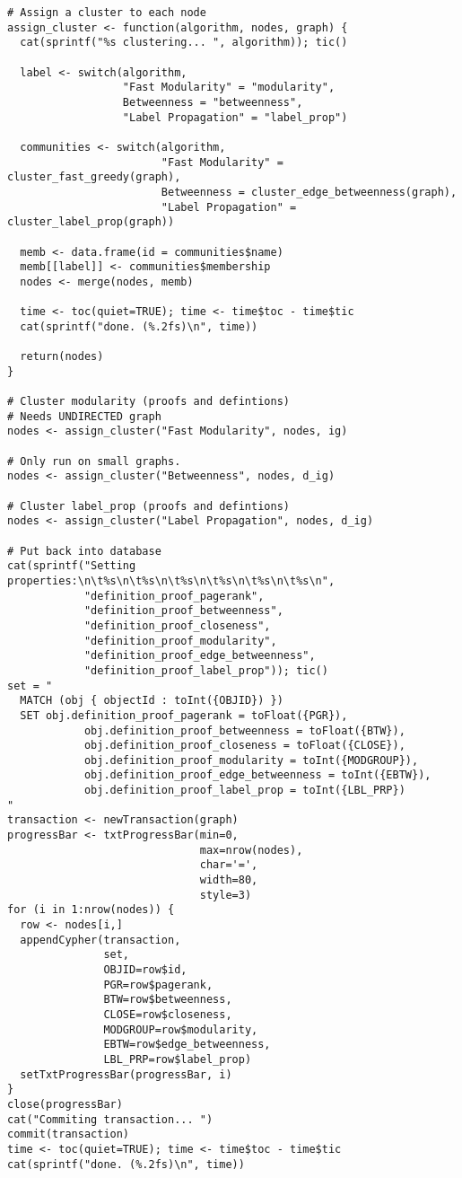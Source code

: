 \begin{verbatim}
# Assign a cluster to each node
assign_cluster <- function(algorithm, nodes, graph) {
  cat(sprintf("%s clustering... ", algorithm)); tic()

  label <- switch(algorithm,
                  "Fast Modularity" = "modularity",
                  Betweenness = "betweenness",
                  "Label Propagation" = "label_prop")

  communities <- switch(algorithm,
                        "Fast Modularity" = cluster_fast_greedy(graph),
                        Betweenness = cluster_edge_betweenness(graph),
                        "Label Propagation" = cluster_label_prop(graph))

  memb <- data.frame(id = communities$name)
  memb[[label]] <- communities$membership
  nodes <- merge(nodes, memb)

  time <- toc(quiet=TRUE); time <- time$toc - time$tic
  cat(sprintf("done. (%.2fs)\n", time))

  return(nodes)
}

# Cluster modularity (proofs and defintions) 
# Needs UNDIRECTED graph
nodes <- assign_cluster("Fast Modularity", nodes, ig)

# Only run on small graphs.
nodes <- assign_cluster("Betweenness", nodes, d_ig)

# Cluster label_prop (proofs and defintions)
nodes <- assign_cluster("Label Propagation", nodes, d_ig)

# Put back into database
cat(sprintf("Setting properties:\n\t%s\n\t%s\n\t%s\n\t%s\n\t%s\n\t%s\n",
            "definition_proof_pagerank",
            "definition_proof_betweenness",
            "definition_proof_closeness",
            "definition_proof_modularity",
            "definition_proof_edge_betweenness",
            "definition_proof_label_prop")); tic()
set = "
  MATCH (obj { objectId : toInt({OBJID}) })
  SET obj.definition_proof_pagerank = toFloat({PGR}), 
            obj.definition_proof_betweenness = toFloat({BTW}),
            obj.definition_proof_closeness = toFloat({CLOSE}),
            obj.definition_proof_modularity = toInt({MODGROUP}),
            obj.definition_proof_edge_betweenness = toInt({EBTW}),
            obj.definition_proof_label_prop = toInt({LBL_PRP})
"
transaction <- newTransaction(graph)
progressBar <- txtProgressBar(min=0,
                              max=nrow(nodes),
                              char='=',
                              width=80, 
                              style=3)
for (i in 1:nrow(nodes)) {
  row <- nodes[i,]
  appendCypher(transaction,
               set,
               OBJID=row$id,
               PGR=row$pagerank,
               BTW=row$betweenness,
               CLOSE=row$closeness,
               MODGROUP=row$modularity,
               EBTW=row$edge_betweenness,
               LBL_PRP=row$label_prop)
  setTxtProgressBar(progressBar, i)
}
close(progressBar)
cat("Commiting transaction... ")
commit(transaction)
time <- toc(quiet=TRUE); time <- time$toc - time$tic
cat(sprintf("done. (%.2fs)\n", time))
\end{verbatim}

